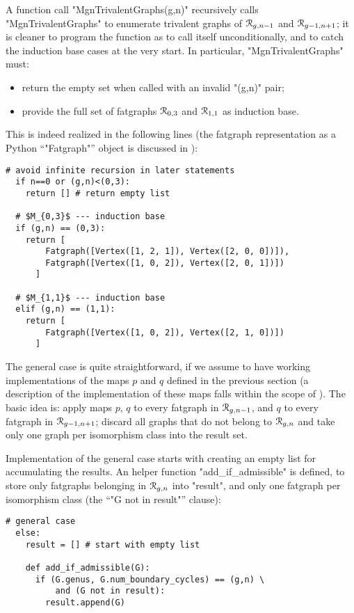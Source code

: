 A function call "MgnTrivalentGraphs(g,n)" recursively calls
"MgnTrivalentGraphs" to enumerate trivalent graphs of $\mathcal{R}_{g,n-1}$
and $\mathcal{R}_{g-1,n+1}$; it is cleaner to program the function as to call itself
unconditionally, and to catch the induction base cases at the very
start.  In particular, "MgnTrivalentGraphs" must:
\begin{itemize}
\item return the empty set when called with an invalid "(g,n)" pair;
\item provide the full set of fatgraphs $\mathcal{R}_{0,3}$ and $\mathcal{R}_{1,1}$ as
  induction base.
\end{itemize}
This is indeed realized in the following lines (the fatgraph
representation as a Python ``"Fatgraph"'' object is discussed in
):
\begin{lstlisting}[name=MgnTrivalentGraphs,firstnumber=6]
  # avoid infinite recursion in later statements
  if n==0 or (g,n)<(0,3):
    return [] # return empty list

  # $M_{0,3}$ --- induction base
  if (g,n) == (0,3):
    return [ 
        Fatgraph([Vertex([1, 2, 1]), Vertex([2, 0, 0])]),
        Fatgraph([Vertex([1, 0, 2]), Vertex([2, 0, 1])]) 
      ]

  # $M_{1,1}$ --- induction base
  elif (g,n) == (1,1):
    return [ 
        Fatgraph([Vertex([1, 0, 2]), Vertex([2, 1, 0])]) 
      ]
\end{lstlisting}

The general case is quite straightforward, if we assume to have
working implementations of the maps $p$ and $q$ defined in the
previous section (a description of the implementation of these maps
falls within the scope of ).  The basic
idea is: apply maps $p$, $q$ to every fatgraph in $\mathcal{R}_{g,n-1}$, and
$q$ to every fatgraph in $\mathcal{R}_{g-1,n+1}$; discard all graphs that do
not belong to $\mathcal{R}_{g,n}$ and take only one graph per isomorphism class
into the result set.

Implementation of the general case starts with creating an empty list
for accumulating the results.  An helper function
"add_if_admissible" is defined, to store only fatgraphs belonging in
$\mathcal{R}_{g,n}$ into "result", and only one fatgraph per isomorphism
class (the ``"G not in result"'' clause):
\begin{lstlisting}[name=MgnTrivalentGraphs,firstnumber=22]
  # general case
  else:
    result = [] # start with empty list

    def add_if_admissible(G):
      if (G.genus, G.num_boundary_cycles) == (g,n) \
          and (G not in result):
        result.append(G)
      
\end{lstlisting}

